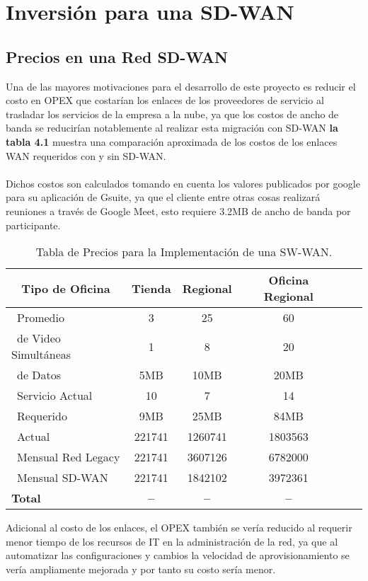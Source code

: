 \chapter{Inversión para una SD-WAN}
\label{cha:Inversión para una SD-WAN}

\section{Precios en una Red SD-WAN} %
\label{sec:Precios en una Red SD-WAN}

Una de las mayores motivaciones para el desarrollo de este proyecto es reducir el costo en OPEX que costarían los enlaces de los proveedores de servicio al trasladar los servicios de la empresa a la nube, ya que los costos de ancho de banda se reducirían notablemente al realizar esta migración con SD-WAN \textbf{la tabla 4.1} muestra una comparación aproximada de los costos de los enlaces WAN requeridos con y sin SD-WAN. 
\\
\\
Dichos costos son calculados tomando en cuenta los valores publicados por google para su aplicación de Gsuite, ya que el cliente entre otras cosas realizará reuniones a través de Google Meet, esto requiere 3.2MB de ancho de banda por participante.

\begin{table}[ht]
	\caption{Tabla de Precios  para la Implementación de una SW-WAN.}
	\label{tab:hla:results}
\centering
\begin{tabular}{lccccc}
	\toprule
	\multicolumn{1}{c}{\textbf{Tipo de Oficina}} 	& \textbf{Tienda}	& \textbf{Regional}	& \textbf{Oficina Regional}\\
	\midrule
\cite{Usuarios}~Promedio 		& 3 & 25 & 60	 \\
\cite{Sesiones}~de Video Simultáneas & 1& 8	& 20	\\
\cite{Trafico}~de Datos	& 5MB	& 10MB	& 20MB	\\
\cite{BW}~Servicio Actual		& 10& 7	& 14	 \\
\cite{BW}~Requerido	& 9MB	& 25MB	& 84MB	 \\
\cite{Costo}~Actual			& 221741	& 1260741	& 1803563	\\
\cite{Costo}~Mensual Red Legacy		& 221741	& 3607126	& 6782000 \\
\cite{Costo}~Mensual SD-WAN	& 221741	& 1842102	& 3972361\\
	\midrule
	\textbf{Total}			& \textbf{--}		& \textbf{--}		& \textbf{--} \\
	\bottomrule
\end{tabular}
\end{table}
Adicional al costo de los enlaces, el OPEX también se vería reducido al requerir menor tiempo de los recursos de IT en la administración de la red, ya que al automatizar las configuraciones y cambios la velocidad de aprovisionamiento se vería ampliamente mejorada y por tanto su costo sería menor.


